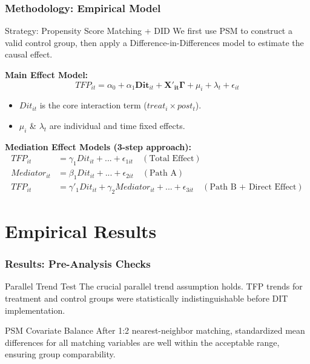 \documentclass[aspectratio=169]{beamer}
\begin{document}
\begin{frame}
  \frametitle{Methodology: Empirical Model}
  \begin{block}{Strategy: Propensity Score Matching + DID}
  We first use PSM to construct a valid control group, then apply a Difference-in-Differences model to estimate the causal effect.
  \end{block}
  
  \textbf{Main Effect Model:}
  \begin{equation}
     TFP_{it} = \alpha_0 + \alpha_1 \textbf{Dit}_{it} + \mathbf{X'_{it}}\mathbf{\Gamma} + \mu_i + \lambda_t + \epsilon_{it}
  \end{equation}
  \begin{itemize}
    \item $Dit_{it}$ is the core interaction term ($treat_i \times post_t$).
    \item $\mu_i$ & $\lambda_t$ are individual and time fixed effects.
  \end{itemize}
  \vfill
  \textbf{Mediation Effect Models (3-step approach):}
  \begin{align}
    TFP_{it} &= \gamma_1 Dit_{it} + ... + \epsilon_{1it} \quad (\text{Total Effect}) \\
    Mediator_{it} &= \beta_1 Dit_{it} + ... + \epsilon_{2it} \quad (\text{Path A}) \\
    TFP_{it} &= \gamma'_1 Dit_{it} + \gamma_2 Mediator_{it} + ... + \epsilon_{3it} \quad (\text{Path B + Direct Effect})
  \end{align}
\end{frame}

\section{Empirical Results}

\begin{frame}
  \frametitle{Results: Pre-Analysis Checks}
    \begin{block}{Parallel Trend Test}
        The crucial parallel trend assumption holds. TFP trends for treatment and control groups were statistically indistinguishable before DIT implementation.
    \end{block}
    \begin{block}{PSM Covariate Balance}
        After 1:2 nearest-neighbor matching, standardized mean differences for all matching variables are well within the acceptable range, ensuring group comparability.
    \end{block}
\end{frame}
\end{document}
